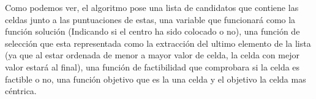 Como podemos ver, el algoritmo pose una lista de candidatos que contiene las celdas junto a las puntuaciones de estas, una variable que funcionará como la función solución (Indicando si el centro ha sido colocado o no), una función de selección que esta representada como la extracción del ultimo elemento de la lista (ya que al estar ordenada de menor a mayor valor de celda, la celda con mejor valor estará al final), una función de factibilidad que comprobara si la celda es factible o no, una función objetivo que es la una celda y el objetivo la celda mas céntrica. \\\\
